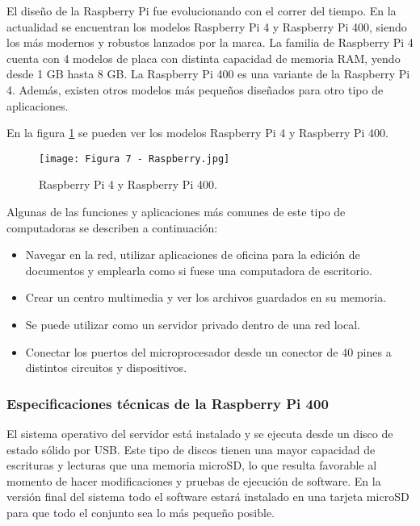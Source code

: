 El diseño de la Raspberry Pi fue evolucionando con el correr del tiempo. En la actualidad se encuentran los modelos Raspberry Pi 4 y Raspberry Pi 400, siendo los más modernos y robustos lanzados por la marca. La familia de Raspberry Pi 4 cuenta con 4 modelos de placa con distinta capacidad de memoria RAM, yendo desde 1 GB hasta 8 GB. La Raspberry Pi 400 es una variante de la Raspberry Pi 4. Además, existen otros modelos más pequeños diseñados para otro tipo de aplicaciones.

En la figura \ref{fig:7} se pueden ver los modelos Raspberry Pi 4 y Raspberry Pi 400.

\begin{figure}[h]
\centering
\texttt{[image: Figura 7 - Raspberry.jpg]}
\caption[Raspberry Pi]{Raspberry Pi 4 y Raspberry Pi 400. \footnotemark}
\label{fig:7}
\end{figure}

Algunas de las funciones y aplicaciones más comunes de este tipo de computadoras se describen a continuación:

\begin{itemize}
	\item Navegar en la red, utilizar aplicaciones de oficina para la edición de documentos y emplearla como si fuese una computadora de escritorio.
	\item Crear un centro multimedia y ver los archivos guardados en su memoria.
	\item Se puede utilizar como un servidor privado dentro de una red local.
	\item Conectar los puertos del microprocesador desde un conector de 40 pines a distintos circuitos y dispositivos.
\end{itemize}

\subsubsection{Especificaciones técnicas de la Raspberry Pi 400}

El sistema operativo del servidor está instalado y se ejecuta desde un disco de estado sólido por USB. Este tipo de discos tienen una mayor capacidad de escrituras y lecturas que una memoria microSD, lo que resulta favorable al momento de hacer modificaciones y pruebas de ejecución de software. En la versión final del sistema todo el software estará instalado en una tarjeta microSD para que todo el conjunto sea lo más pequeño posible.

